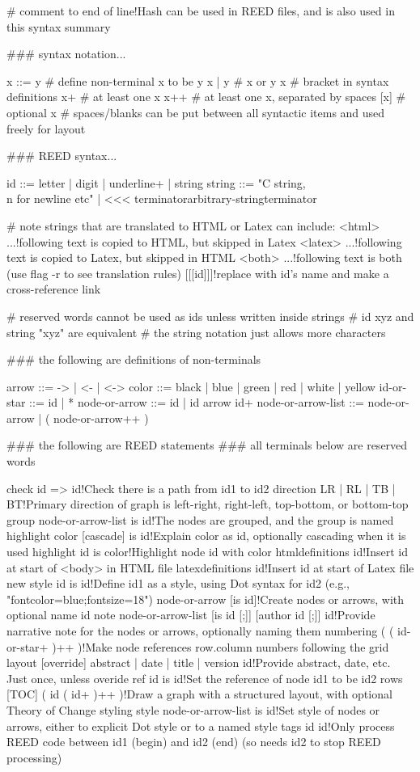 # comment to end of line!Hash can be used in REED files, and is also used in this syntax summary

### syntax notation...

x ::= y # define non-terminal x to be y
x | y   # x or y
{x}     # bracket in syntax definitions
x+      # at least one x
x++     # at least one x, separated by spaces
[x]     # optional x
        # spaces/blanks can be put between all syntactic items and used freely for layout 

### REED syntax...

id ::= {letter | digit | underline}+ | string
string ::= "C string, \\n for newline etc" | <<< terminator\n                                                        arbitrary-string\n                                                terminator

# note strings that are translated to HTML or Latex can include:
<html> ...!following text is copied to HTML, but skipped in Latex
<latex> ...!following text is copied to Latex, but skipped in HTML
<both> ...!following text is both (use flag -r to see translation rules)
[[[id]]]!replace with id's name and make a cross-reference link

# reserved words cannot be used as ids unless written inside strings
# id xyz and string "xyz" are equivalent
# the string notation just allows more characters

### the following are definitions of non-terminals

arrow ::= -> | <- | <->
color ::= black | blue | green | red | white | yellow
id-or-star ::= id | *
node-or-arrow ::= id | id {arrow id}+
node-or-arrow-list ::= node-or-arrow | ( node-or-arrow++ )

### the following are REED statements
### all terminals below are reserved words

check id => id!Check there is a path from id1 to id2
direction {LR | RL | TB | BT}!Primary direction of graph is left-right, right-left, top-bottom, or bottom-top
group node-or-arrow-list is id!The nodes are grouped, and the group is named
highlight color [cascade] is id!Explain color as id, optionally cascading when it is used
highlight id is color!Highlight node id with color
htmldefinitions id!Insert id at start of <body> in HTML file
latexdefinitions id!Insert id at start of Latex file
new style id is id!Define id1 as a style, using Dot syntax for id2 (e.g., "fontcolor=blue;fontsize=18")
node-or-arrow [is id]!Create nodes or arrows, with optional name id
note node-or-arrow-list [is id [;]] [author id [;]] id!Provide narrative note for the nodes or arrows, optionally naming them
numbering ( {( id-or-star+ )}++ )!Make node references row.column numbers following the grid layout
[override] {abstract | date | title | version} id!Provide abstract, date, etc. Just once, unless overide
ref id is id!Set the reference of node id1 to be id2
rows [TOC] ( {id ( id+ )}++ )!Draw a graph with a structured layout, with optional Theory of Change styling
style node-or-arrow-list is id!Set style of nodes or arrows, either to explicit Dot style or to a named style
tags id id!Only process REED code between id1 (begin) and id2 (end) (so needs id2 to stop REED processing)

